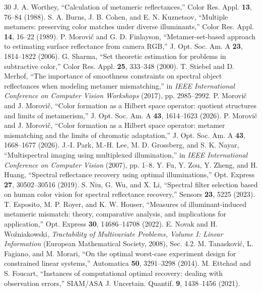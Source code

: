 \documentclass{optica-article}
\begin{document}
\clearpage
\begin{thebibliography}{30}
 J. A. Worthey, ``Calculation of metameric reflectances,'' Color Res. Appl. \textbf{13}, 76--84 (1988).
 S. A. Burns, J. B. Cohen, and E. N. Kuznetsov, ``Multiple metamers: preserving color matches under diverse illuminants,'' Color Res. Appl. \textbf{14}, 16--22 (1989).
 P. Morovi\v{c} and G. D. Finlayson, ``Metamer-set-based approach to estimating surface reflectance from camera RGB,'' J. Opt. Soc. Am. A \textbf{23}, 1814--1822 (2006).
 G. Sharma, ``Set theoretic estimation for problems in subtractive color,'' Color Res. Appl. \textbf{25}, 333--348 (2000).
 T. Stiebel and D. Merhof, ``The importance of smoothness constraints on spectral object reflectances when modeling metamer mismatching,'' in \emph{IEEE International Conference on Computer Vision Workshops} (2017), pp. 2985--2992.
 P. Morovi\v{c} and J. Morovi\v{c}, ``Color formation as a Hilbert space operator: quotient structures and limits of metamerism,'' J. Opt. Soc. Am. A \textbf{43}, 1614--1623 (2026).
 P. Morovi\v{c} and J. Morovi\v{c}, ``Color formation as a Hilbert space operator: metamer mismatching and the limits of chromatic adaptation,'' J. Opt. Soc. Am. A \textbf{43}, 1668--1677 (2026).
 J.-I. Park, M.-H. Lee, M. D. Grossberg, and S. K. Nayar, ``Multispectral imaging using multiplexed illumination,'' in \emph{IEEE International Conference on Computer Vision} (2007), pp. 1--8.
 Y. Fu, Y. Zou, Y. Zheng, and H. Huang, ``Spectral reflectance recovery using optimal illuminations,'' Opt. Express \textbf{27}, 30502--30516 (2019).
 S. Niu, G. Wu, and X. Li, ``Spectral filter selection based on human color vision for spectral reflectance recovery,'' Sensors \textbf{23}, 5225 (2023).
 T. Esposito, M. P. Royer, and K. W. Houser, ``Measures of illuminant-induced metameric mismatch: theory, comparative analysis, and implications for application,'' Opt. Express \textbf{30}, 14686--14708 (2022).
 E. Novak and H. Wo\'zniakowski, \emph{Tractability of Multivariate Problems, Volume I: Linear Information} (European Mathematical Society, 2008), Sec. 4.2.
 M. Tanaskovi\'c, L. Fagiano, and M. Morari, ``On the optimal worst-case experiment design for constrained linear systems,'' Automatica \textbf{50}, 3291--3298 (2014).
 M. Ettehad and S. Foucart, ``Instances of computational optimal recovery: dealing with observation errors,'' SIAM/ASA J. Uncertain. Quantif. \textbf{9}, 1438--1456 (2021).

\end{thebibliography}
\end{document}
